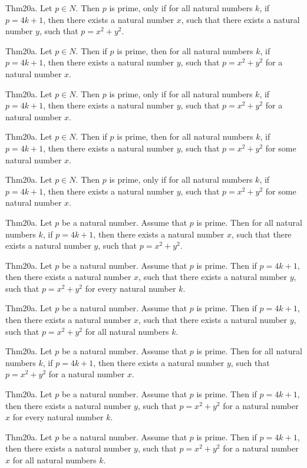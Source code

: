 \documentclass{article}
\begin{document}
Thm20a. Let $p \in N$. Then $p$ is prime, only if for all natural numbers $k$, if $p = 4 k + 1$, then there exists a natural number $x$, such that there exists a natural number $y$, such that $p = x ^{ 2}+ y ^{ 2}$.

Thm20a. Let $p \in N$. Then if $p$ is prime, then for all natural numbers $k$, if $p = 4 k + 1$, then there exists a natural number $y$, such that $p = x ^{ 2}+ y ^{ 2}$ for a natural number $x$.

Thm20a. Let $p \in N$. Then $p$ is prime, only if for all natural numbers $k$, if $p = 4 k + 1$, then there exists a natural number $y$, such that $p = x ^{ 2}+ y ^{ 2}$ for a natural number $x$.

Thm20a. Let $p \in N$. Then if $p$ is prime, then for all natural numbers $k$, if $p = 4 k + 1$, then there exists a natural number $y$, such that $p = x ^{ 2}+ y ^{ 2}$ for some natural number $x$.

Thm20a. Let $p \in N$. Then $p$ is prime, only if for all natural numbers $k$, if $p = 4 k + 1$, then there exists a natural number $y$, such that $p = x ^{ 2}+ y ^{ 2}$ for some natural number $x$.

Thm20a. Let $p$ be a natural number. Assume that $p$ is prime. Then for all natural numbers $k$, if $p = 4 k + 1$, then there exists a natural number $x$, such that there exists a natural number $y$, such that $p = x ^{ 2}+ y ^{ 2}$.

Thm20a. Let $p$ be a natural number. Assume that $p$ is prime. Then if $p = 4 k + 1$, then there exists a natural number $x$, such that there exists a natural number $y$, such that $p = x ^{ 2}+ y ^{ 2}$ for every natural number $k$.

Thm20a. Let $p$ be a natural number. Assume that $p$ is prime. Then if $p = 4 k + 1$, then there exists a natural number $x$, such that there exists a natural number $y$, such that $p = x ^{ 2}+ y ^{ 2}$ for all natural numbers $k$.

Thm20a. Let $p$ be a natural number. Assume that $p$ is prime. Then for all natural numbers $k$, if $p = 4 k + 1$, then there exists a natural number $y$, such that $p = x ^{ 2}+ y ^{ 2}$ for a natural number $x$.

Thm20a. Let $p$ be a natural number. Assume that $p$ is prime. Then if $p = 4 k + 1$, then there exists a natural number $y$, such that $p = x ^{ 2}+ y ^{ 2}$ for a natural number $x$ for every natural number $k$.

Thm20a. Let $p$ be a natural number. Assume that $p$ is prime. Then if $p = 4 k + 1$, then there exists a natural number $y$, such that $p = x ^{ 2}+ y ^{ 2}$ for a natural number $x$ for all natural numbers $k$.
\end{document}
